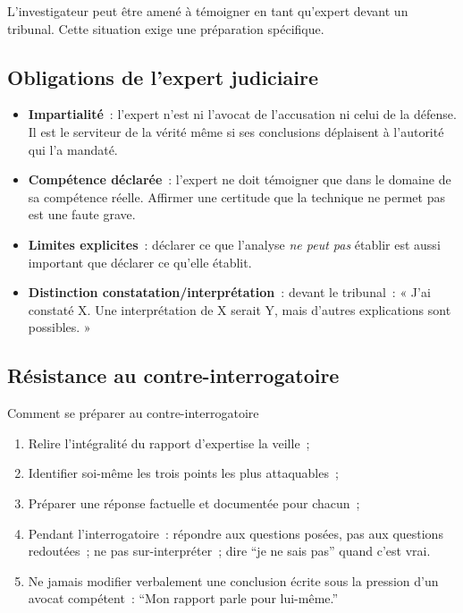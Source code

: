 L'investigateur peut être amené à témoigner en tant qu'expert devant
un tribunal. Cette situation exige une préparation spécifique.

\subsection{Obligations de l'expert judiciaire}

\begin{itemize}
    \item \textbf{Impartialité}~: l'expert n'est ni l'avocat de
          l'accusation ni celui de la défense. Il est le serviteur
          de la vérité même si ses conclusions déplaisent à
          l'autorité qui l'a mandaté.
    \item \textbf{Compétence déclarée}~: l'expert ne doit témoigner
          que dans le domaine de sa compétence réelle. Affirmer une
          certitude que la technique ne permet pas est une faute grave.
    \item \textbf{Limites explicites}~: déclarer ce que l'analyse
          \emph{ne peut pas} établir est aussi important que déclarer
          ce qu'elle établit.
    \item \textbf{Distinction constatation/interprétation}~: devant
          le tribunal~: « J'ai constaté X. Une interprétation de X
          serait Y, mais d'autres explications sont possibles. »
\end{itemize}

\subsection{Résistance au contre-interrogatoire}

\begin{boiteRemarque}{Comment se préparer au contre-interrogatoire}
\begin{enumerate}
    \item Relire l'intégralité du rapport d'expertise la veille~;
    \item Identifier soi-même les trois points les plus attaquables~;
    \item Préparer une réponse factuelle et documentée pour chacun~;
    \item Pendant l'interrogatoire~: répondre aux questions posées,
          pas aux questions redoutées~; ne pas sur-interpréter~;
          dire ``je ne sais pas'' quand c'est vrai.
    \item Ne jamais modifier verbalement une conclusion écrite
          sous la pression d'un avocat compétent~: ``Mon rapport
          parle pour lui-même.''
\end{enumerate}
\end{boiteRemarque}

